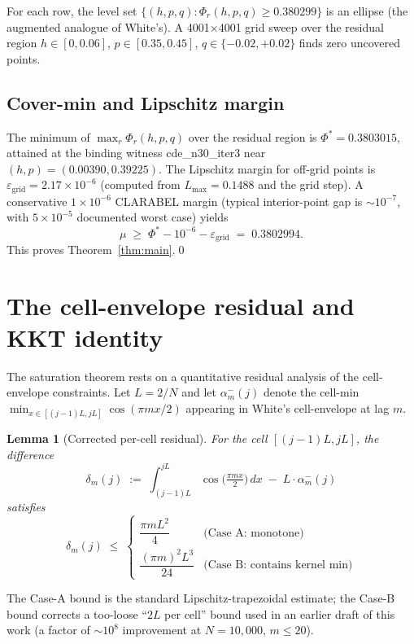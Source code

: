 \documentclass[11pt]{article}
\theoremstyle{plain}
\newtheorem{lemma}[theorem]{Lemma}
\theoremstyle{definition}
\begin{document}
For each row, the level set
$\{(h, p, q) : \Phi_r(h, p, q) \ge 0.380299\}$ is an ellipse (the
augmented analogue of White's). A 4001$\times$4001 grid sweep over the
residual region $h \in [0, 0.06]$, $p \in [0.35, 0.45]$,
$q \in \{-0.02, +0.02\}$ finds zero uncovered points.

\subsection{Cover-min and Lipschitz margin}

The minimum of $\max_r \Phi_r(h, p, q)$ over the residual region is
$\Phi^* = 0.3803015$, attained at the binding witness
cde\_n30\_iter3 near $(h, p) = (0.00390, 0.39225)$. The Lipschitz
margin for off-grid points is $\varepsilon_{\text{grid}} = 2.17 \times
10^{-6}$ (computed from $L_{\max} = 0.1488$ and the grid step). A
conservative $1 \times 10^{-6}$ CLARABEL margin (typical interior-point
gap is $\sim 10^{-7}$, with $5 \times 10^{-5}$ documented worst case)
yields
\[
\mu \;\ge\; \Phi^* - 10^{-6} - \varepsilon_{\text{grid}}
\;=\; 0.3802994.
\]
This proves Theorem~\ref{thm:main}.\qed

\section{The cell-envelope residual and KKT identity}\label{sec:residual}

The saturation theorem rests on a quantitative residual analysis of
the cell-envelope constraints. Let $L = 2/N$ and let $\alpha_m^-(j)$
denote the cell-min $\min_{x \in [(j-1)L, jL]} \cos(\pi m x / 2)$
appearing in White's cell-envelope at lag $m$.

\begin{lemma}[Corrected per-cell residual]\label{lem:per-cell}
For the cell $[(j-1)L, jL]$, the difference
\[
\delta_m(j) \;:=\; \int_{(j-1)L}^{jL} \cos\bigl(\tfrac{\pi m x}{2}\bigr)\, dx
\;-\; L \cdot \alpha_m^-(j)
\]
satisfies
\[
\delta_m(j) \;\le\;
\begin{cases}
\dfrac{\pi m L^2}{4} & \text{(Case A: monotone)} \\[4pt]
\dfrac{(\pi m)^2 L^3}{24} & \text{(Case B: contains kernel min)}
\end{cases}
\]
\end{lemma}

The Case-A bound is the standard Lipschitz-trapezoidal estimate; the
Case-B bound corrects a too-loose ``$2L$ per cell'' bound used in an
earlier draft of this work (a factor of $\sim 10^8$ improvement at
$N = 10{,}000$, $m \le 20$).
\end{document}
